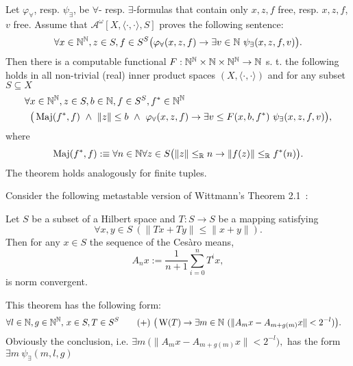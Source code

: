 \begin{thm}\label{t:GKmeta1}
Let $\varphi_\forall$, resp. $\psi_\exists$, be $\forall$-
resp. $\exists$-formulas that contain only $x,z,f$ free, resp. $x,z,f$, $v$ free. Assume that
$\mathcal{A}^\omega[X,\langle\cdot,\cdot\rangle,S]$ proves the following sentence:
\[
\forall  x\in\NN^\NN, z\in S, f\in{S^S} 
	\big( \varphi_\forall(x, z, f)\rightarrow\exists v\in\NN\ \psi_\exists(x, z, f, v)\big).
\]
Then there is a computable functional $F : \mathbb{N}^{\mathbb{N}}\times\mathbb{N}\times\mathbb{N}^{\mathbb{N}}\to\mathbb{N}$ s. t. the following holds
in all non-trivial (real) inner product spaces $(X,\langle\cdot,\cdot\rangle)$ 
and for any subset $S\subseteq X$
\begin{align*}
\forall  &x\in\NN^\NN, z\in S, b\in\NN, f\in{S^S},f^*\in\NN^\NN\\
	&\big( \TMaj(f^*,f)\ \wedge\ \|z\|\leq b\ \wedge\ \varphi_\forall(x, z, f) \rightarrow 
	\exists v\leq F(x,b,f^*)\ \psi_\exists(x, z, f, v) \big),
\end{align*}
where %
\[
\operatorname{Maj}(f^*,f):\equiv \forall n\in\mathbb{N}\forall z\in S \big( \|z\|\leq_{\mathbb{R}} n \rightarrow \|f(z)\|\leq_{\mathbb{R}} f^*(n)\big).
\]
The theorem holds analogously for finite tuples. %
\end{thm}
Consider the following metastable version of Wittmann's Theorem 2.1~\cite{Wittmann90}:
\begin{thm} \label{t:W21}
Let $S$ be a subset of a Hilbert space and $T:S\to S$
be a mapping satisfying 
\[
\forall x,y\in S\ (\| Tx + Ty \| \leq \|x + y\|).\tag{$\TAN$}\label{e:W}
\]
Then for any $x\in S$ the sequence of the Ces{\`a}ro means,
\[
A_nx:=\frac{1}{n+1}\sum^{n}_{i=0} T^i x,
\]
is norm convergent.
\end{thm}
This theorem has the following form:
\begin{align*}
\forall l\in\mathbb{N},g\in\mathbb{N}^{\mathbb{N}}, &\ x\in S, T\in S^S \tag{+}\label{e:w21meta}  
\ \big( \operatorname{W}(T)\rightarrow 
	\exists m\in\mathbb{N} \ (\|A_mx-A_{m+g(m)}x\|< 2^{-l})\big). 
\end{align*}
Obviously the conclusion, i.e. 
$
\exists m\ \big( \|A_mx-A_{m+g(m)}x\| < 2^{-l}\big),
$
has the form $\exists m\ \psi_\exists(m,l,g)$ 
